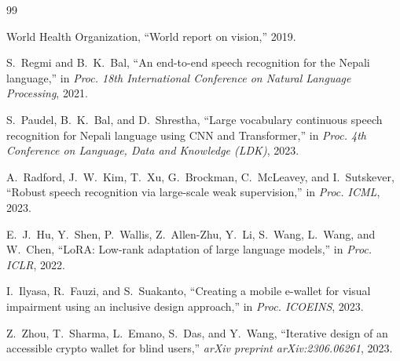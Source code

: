 \documentclass[11pt,a4paper]{article}
\begin{document}

\begin{thebibliography}{99}

World Health Organization,
``World report on vision,''
2019.

S.~Regmi and B.~K.~Bal,
``An end-to-end speech recognition for the Nepali language,''
in \textit{Proc. 18th International Conference on Natural Language Processing}, 2021.

S.~Paudel, B.~K.~Bal, and D.~Shrestha,
``Large vocabulary continuous speech recognition for Nepali language using CNN and Transformer,''
in \textit{Proc. 4th Conference on Language, Data and Knowledge (LDK)}, 2023.

A.~Radford, J.~W.~Kim, T.~Xu, G.~Brockman, C.~McLeavey, and I.~Sutskever,
``Robust speech recognition via large-scale weak supervision,''
in \textit{Proc. ICML}, 2023.

E.~J.~Hu, Y.~Shen, P.~Wallis, Z.~Allen-Zhu, Y.~Li, S.~Wang, L.~Wang, and W.~Chen,
``LoRA: Low-rank adaptation of large language models,''
in \textit{Proc. ICLR}, 2022.

I.~Ilyasa, R.~Fauzi, and S.~Suakanto,
``Creating a mobile e-wallet for visual impairment using an inclusive design approach,''
in \textit{Proc. ICOEINS}, 2023.

Z.~Zhou, T.~Sharma, L.~Emano, S.~Das, and Y.~Wang,
``Iterative design of an accessible crypto wallet for blind users,''
\textit{arXiv preprint arXiv:2306.06261}, 2023.

\end{thebibliography}
\end{document}
